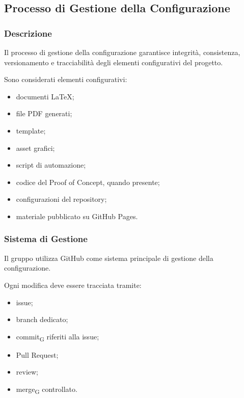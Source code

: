 \subsection{Processo di Gestione della Configurazione}
\label{sec:configurazione}

\subsubsection{Descrizione}

Il processo di gestione della configurazione garantisce integrità, consistenza,
versionamento e tracciabilità degli elementi configurativi del progetto.

Sono considerati elementi configurativi:

\begin{itemize}
    \item documenti \LaTeX{};
    \item file PDF generati;
    \item template;
    \item asset grafici;
    \item script di automazione;
    \item codice del Proof of Concept, quando presente;
    \item configurazioni del repository;
    \item materiale pubblicato su GitHub Pages.
\end{itemize}


\subsubsection{Sistema di Gestione}

Il gruppo utilizza GitHub come sistema principale di gestione della configurazione.

Ogni modifica deve essere tracciata tramite:

\begin{itemize}
    \item issue;
    \item branch dedicato;
    \item commit\textsubscript{G} riferiti alla issue;
    \item Pull Request;
    \item review;
    \item merge\textsubscript{G} controllato.
\end{itemize}

